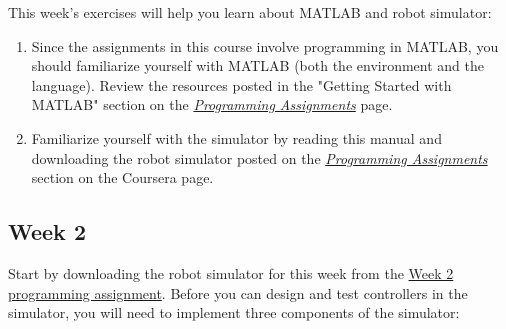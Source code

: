 \documentclass[10pt]{article}
\begin{document}
This week's exercises will help you learn about MATLAB and robot simulator:

\begin{enumerate}
\item Since the assignments in this course involve programming in MATLAB, you should familiarize yourself with MATLAB (both the environment and the language). Review the resources posted in the "Getting Started with MATLAB" section on the \href{https://class.coursera.org/conrob-002/wiki/ProgrammingAssignments}{\textit{Programming Assignments}} page.

\item Familiarize yourself with the simulator by reading this manual and downloading the robot simulator posted on the \href{https://class.coursera.org/conrob-002/wiki/ProgrammingAssignments}{\textit{Programming Assignments}} section on the Coursera page.
\end{enumerate}

\subsection{Week 2}
\label{sec:week-2}
Start by downloading the robot simulator for this week from the \href{https://class.coursera.org/conrob-002/assignment/view?assignment_id=5}{Week 2 programming assignment}. Before you can design and test controllers in the simulator, you will need to implement three components of the simulator:
\end{document}
